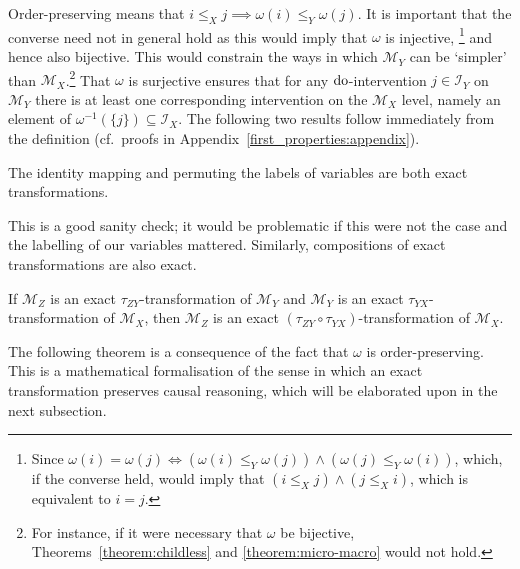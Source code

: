 Order-preserving means that ${i \leq_X j \implies \omega(i) \leq_Y \omega(j)}$.
It is important that the converse need not in general hold as this would imply that $\omega$ is injective,%
\footnote{Since ${\omega(i)=\omega(j) \iff \left(\omega(i) \leq_Y \omega(j)\right) \land \left(\omega(j) \leq_Y \omega(i)\right)}$, which, if the converse held, would imply that $\left(i \leq_X j\right) \land \left(j \leq_X i\right)$, which is equivalent to $i=j$.}
and hence also bijective.
This would constrain the ways in which $\mathcal{M}_Y$ can be `simpler' than $\mathcal{M}_X$.\footnote{For instance, if it were necessary that $\omega$ be bijective, Theorems~\ref{theorem:childless} and \ref{theorem:micro-macro} would not hold.}
That $\omega$ is surjective ensures that for any $\operatorname{do}$-intervention $j \in \mathcal{I}_Y$ on $\mathcal{M}_Y$ there is at least one corresponding intervention on the $\mathcal{M}_X$ level, namely an element of $\omega^{-1}(\{j\}) \subseteq \mathcal{I}_X$.
The following two results follow immediately from the definition (cf.\ proofs in Appendix~\ref{first_properties:appendix}).

\begin{lemma}\label{lemma:elementary}
The identity mapping and permuting the labels of variables are both exact transformations.
\end{lemma}

This is a good sanity check; it would be problematic if this were not the case and the labelling of our variables mattered. Similarly, compositions of exact transformations are also exact.

\begin{lemma}\label{theorem:transitivity}
    If $\mathcal{M}_Z$ is an exact $\tau_{ZY}$-transformation of $\mathcal{M}_Y$ and $\mathcal{M}_Y$ is an exact $\tau_{YX}$-transformation of $\mathcal{M}_X$, then $\mathcal{M}_Z$ is an exact $(\tau_{ZY}\circ\tau_{YX})$-transformation of $\mathcal{M}_X$.
\end{lemma}

The following theorem is a consequence of the fact that $\omega$ is order-preserving. This is a mathematical formalisation of the sense in which an exact transformation preserves causal reasoning, which will be elaborated upon in the next subsection.


